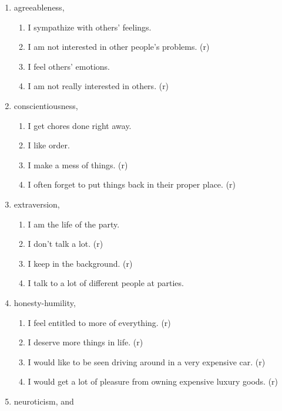 \documentclass[
  single column]{article}
\providecommand{\tightlist}{%
  \setlength{\itemsep}{0pt}\setlength{\parskip}{0pt}}\usepackage{longtable,booktabs,array}
\begin{document}
\begin{enumerate}
\def\labelenumi{\arabic{enumi}.}
\item
  agreeableness,

  \begin{enumerate}
  \def\labelenumii{\roman{enumii}.}
  \tightlist
  \item
    I sympathize with others' feelings.
  \item
    I am not interested in other people's problems. (r)
  \item
    I feel others' emotions.
  \item
    I am not really interested in others. (r)
  \end{enumerate}
\item
  conscientiousness,

  \begin{enumerate}
  \def\labelenumii{\roman{enumii}.}
  \tightlist
  \item
    I get chores done right away.
  \item
    I like order.
  \item
    I make a mess of things. (r)
  \item
    I often forget to put things back in their proper place. (r)
  \end{enumerate}
\item
  extraversion,

  \begin{enumerate}
  \def\labelenumii{\roman{enumii}.}
  \tightlist
  \item
    I am the life of the party.
  \item
    I don't talk a lot. (r)
  \item
    I keep in the background. (r)
  \item
    I talk to a lot of different people at parties.
  \end{enumerate}
\item
  honesty-humility,

  \begin{enumerate}
  \def\labelenumii{\roman{enumii}.}
  \tightlist
  \item
    I feel entitled to more of everything. (r)
  \item
    I deserve more things in life. (r)
  \item
    I would like to be seen driving around in a very expensive car. (r)
  \item
    I would get a lot of pleasure from owning expensive luxury goods.
    (r)
  \end{enumerate}
\item
  neuroticism, and


\end{enumerate}
\end{document}
